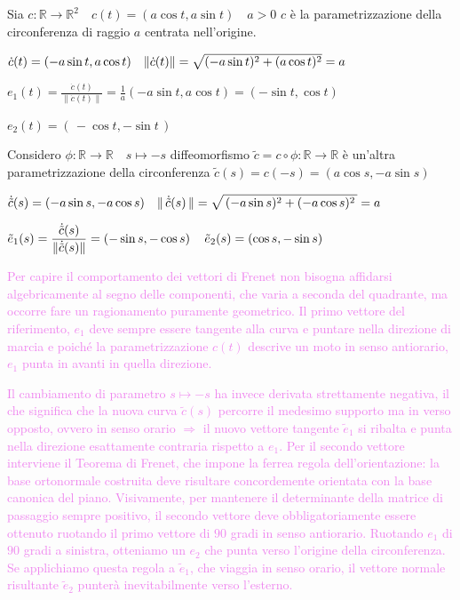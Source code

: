        \begin{esempio}
        Sia $c: \mathbb{R} \to \mathbb{R}^2 \quad c(t) = (a \cos t, a \sin t) \quad a>0$ $c$ è la parametrizzazione della circonferenza di raggio $a$ centrata nell'origine.

        $\dot{c}(t) = (-a \sin t, a \cos t) \quad \lVert\dot{c}(t)\rVert = \sqrt{(-a \sin t)^2 + (a \cos t)^2}  = a$

        $\displaystyle e_1(t) = \frac{\dot{c}(t)}{\|\dot{c}(t)\|} = \frac{1}{a}(-a \sin t, a \cos t) = (-\sin t, \cos t)$

        $e_2(t)= (\,-\cos t, -\sin t\,)$

        Considero $\phi : \mathbb{R} \to \mathbb{R} \quad s \mapsto -s$ diffeomorfismo 
        $\displaystyle \tilde{c} = c \circ \phi: \mathbb{R} \to \mathbb{R}$ è un'altra parametrizzazione della circonferenza
        $\displaystyle \tilde{c}(s) = c(-s)= \left(a \cos s, -a \sin s\right)$ 
        
        $\dot{\tilde{c}}(s) = (-a \sin s, -a \cos s) \quad \displaystyle \lVert \, \dot{\tilde{c}}(s) \,\rVert = \sqrt{ \, (-a \sin s)^2 + (-a \cos s)^2 \, } = a$
        
        $\displaystyle \tilde{e}_1(s) = \frac{\dot{\tilde{c}}(s)}{\lVert\dot{\tilde{c}}(s)\rVert} = \left(- \sin s , - \cos s \right) \quad \tilde{e}_2(s) = (\cos s, -\sin s)$ 

        \textcolor{violet}{Per capire il comportamento dei vettori di Frenet non bisogna affidarsi algebricamente al segno delle componenti, che varia a seconda del quadrante, ma occorre
        fare un ragionamento puramente geometrico. Il primo vettore del riferimento, $e_1$ deve sempre essere tangente alla curva e puntare nella direzione di marcia e poiché la
        parametrizzazione $c(t)$ descrive un moto in senso antiorario, $e_1$ punta in avanti in quella direzione.} 

        \textcolor{violet}{Il cambiamento di parametro $s \mapsto -s$ ha invece derivata strettamente negativa, il che significa che la nuova curva $\tilde{c}(s)$ percorre il medesimo supporto 
        ma in verso opposto, ovvero in senso orario $\Rightarrow$ il nuovo vettore tangente $\tilde{e}_1$ si ribalta e punta nella direzione esattamente contraria rispetto a $e_1$.}
        \textcolor{violet}{Per il secondo vettore interviene il Teorema di Frenet, che impone la ferrea regola dell'orientazione: la base ortonormale costruita deve risultare concordemente 
        orientata con la base canonica del piano. Visivamente, per mantenere il determinante della matrice di passaggio sempre positivo, il secondo vettore deve obbligatoriamente 
        essere ottenuto ruotando il primo vettore di $90$ gradi in senso antiorario. Ruotando $e_1$ di $90$ gradi a sinistra, otteniamo un $e_2$ che punta verso l'origine della circonferenza. 
        Se applichiamo questa regola a $\tilde{e}_1$, che viaggia in senso orario, il vettore normale risultante $\tilde{e}_2$ punterà inevitabilmente verso l'esterno.}
        \begin{center}
        \begin{tikzpicture}[scale=1.1]


\end{tikzpicture}
\end{center}
\end{esempio}

